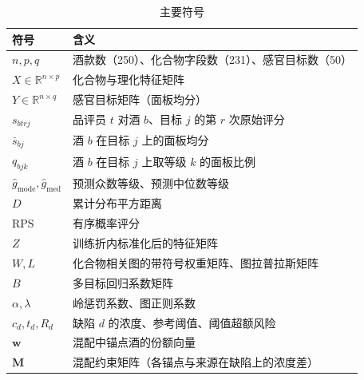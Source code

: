 \begin{table}[t]
\centering\small\renewcommand{\arraystretch}{1.15}
\caption{主要符号}
\label{tab:symbol}
\begin{tabular}{L{0.20\columnwidth}L{0.68\columnwidth}}
\toprule
符号 & 含义 \\
\midrule
$n,p,q$ & 酒款数（250）、化合物字段数（231）、感官目标数（50） \\
$X\in\mathbb{R}^{n\times p}$ & 化合物与理化特征矩阵 \\
$Y\in\mathbb{R}^{n\times q}$ & 感官目标矩阵（面板均分） \\
$s_{btrj}$ & 品评员 $t$ 对酒 $b$、目标 $j$ 的第 $r$ 次原始评分 \\
$\bar s_{bj}$ & 酒 $b$ 在目标 $j$ 上的面板均分 \\
$q_{bjk}$ & 酒 $b$ 在目标 $j$ 上取等级 $k$ 的面板比例 \\
$\hat g_{\text{mode}},\hat g_{\text{med}}$ & 预测众数等级、预测中位数等级 \\
$D$ & 累计分布平方距离 \\
$\mathrm{RPS}$ & 有序概率评分 \\
$Z$ & 训练折内标准化后的特征矩阵 \\
$W,L$ & 化合物相关图的带符号权重矩阵、图拉普拉斯矩阵 \\
$B$ & 多目标回归系数矩阵 \\
$\alpha,\lambda$ & 岭惩罚系数、图正则系数 \\
$c_d,t_d,R_d$ & 缺陷 $d$ 的浓度、参考阈值、阈值超额风险 \\
$\boldsymbol{w}$ & 混配中锚点酒的份额向量 \\
$\boldsymbol{M}$ & 混配约束矩阵（各锚点与来源在缺陷上的浓度差） \\
\bottomrule
\end{tabular}
\end{table}
